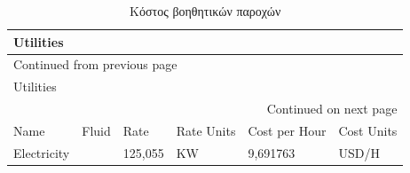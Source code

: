\documentclass[11pt]{article}
\begin{document}
\begin{longtable}{llllll}
\caption{Κόστος βοηθητικών παροχών}
\\
Utilities &  &  &  &  & \\
\hline
\endfirsthead
\multicolumn{6}{l}{Continued from previous page} \\
\hline

Utilities &  &  &  &  &  \\

\hline
\endhead
\hline\multicolumn{6}{r}{Continued on next page} \\
\endfoot
\endlastfoot
\hline
Name & Fluid & Rate & Rate Units & Cost per Hour & Cost Units\\
Electricity &  & 125,055 & KW & 9,691763 & USD/H\\
\end{longtable}
\end{document}
